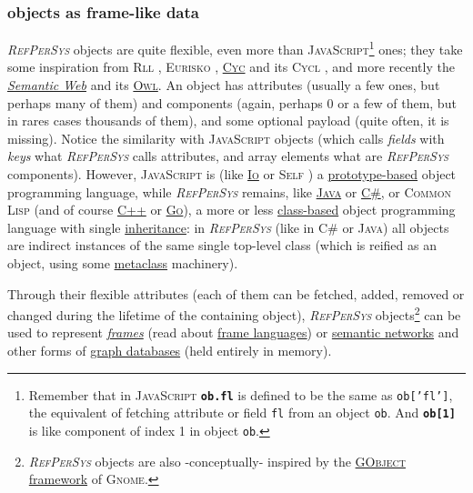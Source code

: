 \documentclass[11pt,a4paper,svgnames]{article}
\newcommand{\RefPerSys}{{\textit{\textsc{RefPerSys}}}}
\begin{document}
\subsubsection{objects as frame-like data}
\label{subsubsec:obj-frame}

{\RefPerSys} objects are quite flexible, even more than
\textsc{JavaScript}\footnote{Remember that in \textsc{JavaScript}
\textbf{\texttt{ob.fl}} is defined to be the same as
\texttt{ob['fl']}, the equivalent of fetching attribute or field
\texttt{fl} from an object \texttt{ob}. And \textbf{\texttt{ob[1]}} is
like component of index 1 in object \texttt{ob}.} ones; they take some
inspiration from \textsc{Rll} \cite{greiner:1980:representation},
\textsc{Eurisko} \cite{Lenat:1983:Eurisko, Lenat:1983:theory},
\href{https://en.wikipedia.org/wiki/Cyc}{\textsc{Cyc}} and its
\textsc{Cycl} \cite{Lenat:1991:ev-cycl}, and more recently the
\href{https://en.wikipedia.org/wiki/Semantic_Web}{\textit{Semantic
    Web}} and its
\href{https://www.w3.org/TR/owl-ref/}{\textsc{Owl}}. An object has
attributes (usually a few ones, but perhaps many of them) and
components (again, perhaps 0 or a few of them, but in rares cases
thousands of them), and some optional payload (quite often, it is
missing). Notice the similarity with \textsc{JavaScript} objects
(which calls \emph{fields} with \emph{keys} what {\RefPerSys} calls
attributes, and array elements what are {\RefPerSys}
components). However, \textsc{JavaScript} is (like
\href{http://iolanguage.com/}{\textsc{Io}} or \textsc{Self}
\cite{chambers:1991:efficient}) a
\href{https://en.wikipedia.org/wiki/Prototype-based_programming}{prototype-based}
object programming language, while {\RefPerSys} remains, like
\href{https://en.wikipedia.org/wiki/Java_(programming_language)}{\textsc{Java}}
or
\href{https://en.wikipedia.org/wiki/C_Sharp_(programming_language)}{\textsc{C\#}},
or \textsc{Common Lisp} (and of course
\href{https://en.cppreference.com/w/cpp}{\textsc{C++}} or
\href{https://golang.org/}{\textsc{Go}}), a more or less
\href{https://en.wikipedia.org/wiki/Class_(computer_programming)}{class-based}
object programming language with single
\href{https://en.wikipedia.org/wiki/Inheritance_(object-oriented_programming)}{inheritance}:
in {\RefPerSys} (like in \textsc{C\#} or \textsc{Java}) all objects
are indirect instances of the same single top-level class (which is
reified as an object, using some
\href{https://en.wikipedia.org/wiki/Metaclass}{metaclass} machinery).

Through their flexible attributes (each of them can be fetched, added,
removed or changed during the lifetime of the containing object),
{\RefPerSys} objects\footnote{{\RefPerSys} objects are also -conceptually-
  inspired by the
  \href{https://developer.gnome.org/gobject/stable/}{\textsc{GObject}
    framework} of \textsc{Gnome}.} can be used to represent
\href{https://en.wikipedia.org/wiki/Frame_(artificial_intelligence)}{\emph{frames}}
(read about \href{https://en.wikipedia.org/wiki/Frame_language}{frame
  languages}) or
\href{https://en.wikipedia.org/wiki/Semantic_network}{semantic
  networks} and other forms of
\href{https://en.wikipedia.org/wiki/Graph_database}{graph databases}
(held entirely in memory).
\end{document}
